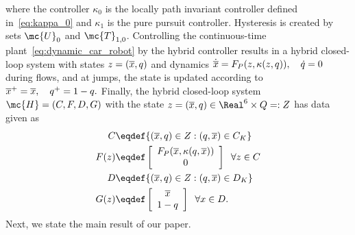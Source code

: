 where the controller $\kappa_0$ is the locally path invariant controller defined in~\eqref{eq:kappa_0} and $\kappa_1$ is the pure pursuit controller. Hysteresis is created by sets $\mc{U}_{0}$ and $\mc{T}_{1,0}$.
Controlling the continuous-time plant~\eqref{eq:dynamic_car_robot} by the hybrid controller results in a hybrid closed-loop system with states $z = (\overline{x},q)$ and dynamics 
$
    \dot {\overline{x}} = F_P(z,\kappa(z,q)), \quad \dot q = 0
$
during flows, and at jumps, the state is updated according to 
$
    \overline{x}^{+} = \overline{x},\quad q^{+} = 1-q.
$
Finally, the hybrid closed-loop system $\mc{H} = (C,F,D,G)$ with the state $z = (\agx,q) \in \Real^6 \times Q =: Z$ has data given as 
\begin{equation}
\label{eq:data-CLS-circle}
\begin{aligned}
    C &\eqdef \{(\agx,q) \in Z : (q,\agx) \in C_{K} \}\\
    F(z) &\eqdef \left[\begin{array}{c}
        F_P(\agx,\kappa(q, \agx))   \\
         0
    \end{array}\right]\;\; \forall z \in C\\
    D &\eqdef \{(\agx,q) \in Z : (q,\agx) \in D_{K} \}\\
    G(z) &\eqdef \left[\begin{array}{c}
         \agx   \\
         1-q
    \end{array}\right]\;\; \forall x \in D.
\end{aligned}
\end{equation}
Next, we state the main result of our paper.

